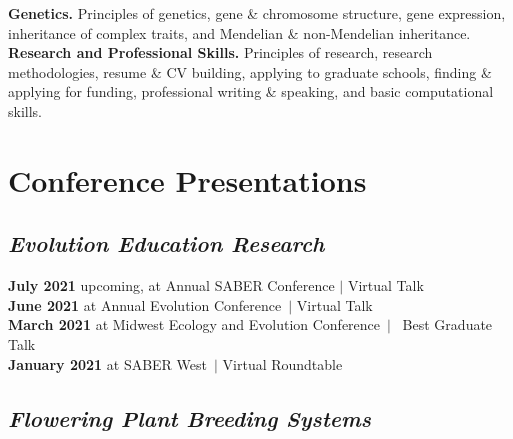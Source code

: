 \documentclass[]{article}
\begin{document}
\textbf{Genetics.} Principles of genetics, gene \& chromosome structure, gene expression, inheritance of complex traits, and Mendelian \& non-Mendelian inheritance.\\

\textbf{Research and Professional Skills.} Principles of research, research methodologies, resume \& CV building, applying to graduate schools, finding \& applying for funding, professional writing \& speaking, and basic computational skills.

\vspace{5mm}

\section{\fontsize{16}{48}\selectfont Conference Presentations}
\vspace{-5mm}

\subsection{\fontsize{12}{36}\selectfont \textit{Evolution Education Research}}

\textbf{July 2021} upcoming, at Annual SABER Conference $\vert$ Virtual Talk \hspace{0.3mm} \href{https://github.com/ledelaney/07-21-SABER}{\faGithub} \\
\textbf{June 2021} at Annual Evolution Conference\ $\vert$ Virtual Talk \hspace{0.3mm} \href{https://uofi.box.com/v/2021evolution}{\faVideo} \href{https://ledelaney.org/talks/2021evolution}{\faImages} \href{https://github.com/ledelaney/06-21-Evolution}{\faGithub}\\
\textbf{March 2021} at Midwest Ecology and Evolution Conference\ $\vert$ \faAward\ Best Graduate Talk\ \hspace{0.1mm} \href{https://uofi.box.com/v/2021meec-talk}{\faVideo} \href{https://ledelaney.org/talks/2021meec/}{\faImages} \href{https://github.com/ledelaney/03-21-MEEC}{\faGithub}\\
\textbf{January 2021} at SABER West\ $\vert$ Virtual Roundtable \hspace{0.4mm} \href{https://ledelaney.org/talks/2021saberw/}{\faImages} \href{https://github.com/ledelaney/01-21-SABERwest}{\faGithub}

\vspace{-5mm}

\subsection{\fontsize{12}{36}\selectfont \textit{Flowering Plant Breeding Systems}}
\end{document}
